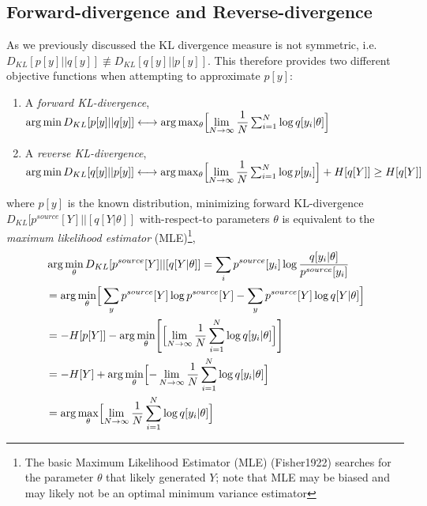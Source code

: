 \documentclass[7pt]{article}
\begin{document}
\subsection{Forward-divergence and Reverse-divergence}

As we previously discussed the KL divergence measure is not symmetric, i.e. $D_{KL} [p[y]||q[y]] \not\equiv D_{KL} [q[y]||p[y]]$. This therefore provides two different objective functions when attempting to approximate $p[y]$:
\begin{enumerate}
\item A \emph{forward KL-divergence}, $\arg \min D_{KL} [p[y]||q[y]] \longleftrightarrow \arg \max_{\theta} \Bigl[ \lim\limits_{ N \rightarrow \infty } \dfrac{1}{N} \sum^N_{i=1} \log q[y_i|\theta]\Bigr]  $
\item A \emph{reverse KL-divergence}, $\arg \min D_{KL} [q[y]||p[y]] \longleftrightarrow  \arg \max_{\theta} \Bigl[ \lim\limits_{ N \rightarrow \infty } \dfrac{1}{N} \sum^N_{i=1} \log p[y_i]\Bigr]  + H[q[Y]] \geq H[q[Y]]\\
 $
\end{enumerate}
where $p[y]$ is the known distribution, minimizing forward KL-divergence $D_{KL} [p^{source}[Y]||[q[Y|\theta]]$ with-respect-to parameters $\theta$ is equivalent to the \emph{maximum likelihood estimator} (MLE)\footnote{The basic Maximum Likelihood Estimator (MLE) (Fisher1922) searches for the parameter $\theta$ that likely generated $Y$; note that MLE may be biased and may likely not be an optimal minimum variance estimator},
\begin{equation}
\begin{split}
& \arg \min_{\theta} D_{KL} [p^{source}[Y]||[q[Y|\theta]] = \sum_{i} p^{source}[y_i] \log \dfrac{q[y_i|\theta]}{p^{source}[y_i]}  \\
& =  \arg \min_{\theta} \Bigr[  \sum_{y} p^{source}[Y] \log {p^{source}[Y] }   - \sum_{y} p^{source}[Y] \log {q[Y|\theta]} \Bigr]\\
& =  -H[p[Y]] - \arg \min_{\theta} \Biggr[  \Bigl[ \lim\limits_{ N \rightarrow \infty } \dfrac{1}{N} \sum^N_{i=1} \log q[y_i|\theta]\Bigr] \Biggr]  \\
&  = -H[Y] + \arg \min_{\theta} \Bigl[ - \lim\limits_{ N \rightarrow \infty } \dfrac{1}{N} \sum^N_{i=1} \log q[y_i|\theta]\Bigr]  \\
&  =  \arg \max_{\theta} \Bigl[ \lim\limits_{ N \rightarrow \infty } \dfrac{1}{N} \sum^N_{i=1} \log q[y_i|\theta]\Bigr]  \\
\end{split}
\end{equation}
\end{document}
